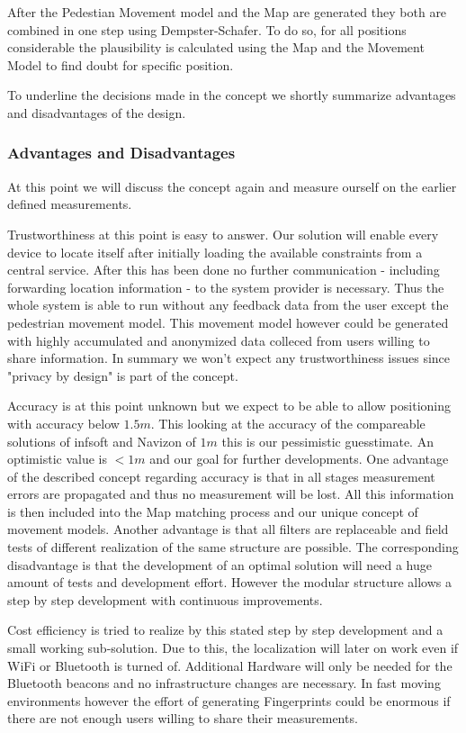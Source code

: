 After the Pedestian Movement model and the Map are generated they both are combined in one step using Dempster-Schafer. To do so, for all positions considerable the plausibility is calculated using the Map and the Movement Model to find doubt for specific position. 

To underline the decisions made in the concept we shortly summarize advantages and disadvantages of the design.

\subsubsection{Advantages and Disadvantages}
At this point we will discuss the concept again and measure ourself on the earlier defined measurements. 

Trustworthiness at this point is easy to answer. Our solution will enable every device to locate itself after initially loading the available constraints from a central service. After this has been done no further communication - including forwarding location information - to the system provider is necessary. Thus the whole system is able to run without any feedback data from the user except the pedestrian movement model. This movement model however could be generated with highly accumulated and anonymized data colleced from users willing to share information. In summary we won't expect any trustworthiness issues since "privacy by design" is part of the concept.

Accuracy is at this point unknown but we expect to be able to allow positioning with accuracy below $1.5m$. This looking at the accuracy of the compareable solutions of infsoft and Navizon of $1m$ this is our pessimistic guesstimate. An optimistic value is $<1m$ and our goal for further developments. One advantage of the described concept regarding accuracy is that in all stages measurement errors are propagated and thus no measurement will be lost. All this information is then included into the Map matching process and our unique concept of movement models. Another advantage is that all filters are replaceable and field tests of different realization of the same structure are possible. The corresponding disadvantage is that the development of an optimal solution will need a huge amount of tests and development effort. However the modular structure allows a step by step development with continuous improvements.

Cost efficiency is tried to realize by this stated step by step development and a small working sub-solution. Due to this, the localization will later on work even if WiFi or Bluetooth is turned of.  Additional Hardware will only be needed for the Bluetooth beacons and no infrastructure changes are necessary. In fast moving environments however the effort of generating Fingerprints could be enormous if there are not enough users willing to share their measurements.

